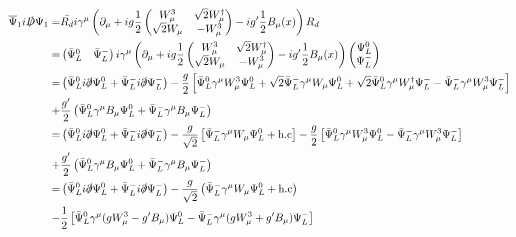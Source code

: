 \begin{align}
\label{eq:kin1}
\overline{\Psi}_1 i\slashed{D}\Psi_1 
=&\bar{R_d}i\gamma^{\mu}\left(\partial_{\mu}
+ig\dfrac{1}{2}\begin{pmatrix}
W_{\mu}^3 & \sqrt{2}W_{\mu}^{\dagger} \\
\sqrt{2}W_{\mu} & -W_{\mu}^3
\end{pmatrix}
-ig'\dfrac{1}{2} B_{\mu}(x)\right)R_d\nonumber\\
=&\begin{pmatrix}
\bar{\Psi}_L^0 & \bar{\Psi}_L^-
\end{pmatrix} i\gamma^{\mu}\left(\partial_{\mu}
+ig\dfrac{1}{2}\begin{pmatrix}
W_{\mu}^3 & \sqrt{2}W_{\mu}^{\dagger} \\
\sqrt{2}W_{\mu} & -W_{\mu}^3
\end{pmatrix}
-ig'\dfrac{1}{2} B_{\mu}(x)\right)\begin{pmatrix}
\Psi_L^0 \\ \Psi_L^-
\end{pmatrix}\nonumber\\
=&\left(\bar{\Psi}_L^0i\slashed{\partial}\Psi_L^0+\bar{\Psi}_L^-i\slashed{\partial}\Psi_L^-\right)
-\dfrac{g}{2}\left[\bar{\Psi}_L^0\gamma^{\mu}W_{\mu}^3\Psi_L^0+\sqrt{2}\bar{\Psi}_L^-\gamma^{\mu}W_{\mu}\Psi_L^0
+\sqrt{2}\bar{\Psi}_L^0\gamma^{\mu}W_{\mu}^{\dagger}\Psi_L^--\bar{\Psi}_L^-\gamma^{\mu}W_{\mu}^3\Psi_L^-\right]
\nonumber\\
+&\dfrac{g'}{2}\left(\bar{\Psi}_L^0\gamma^{\mu}B_{\mu}\Psi_L^0+\bar{\Psi}_L^-\gamma^{\mu}B_{\mu}\Psi_L^-\right)
\nonumber\\
=&\left(\bar{\Psi}_L^0i\slashed{\partial}\Psi_L^0+\bar{\Psi}_L^-i\slashed{\partial}\Psi_L^-\right)
-\dfrac{g}{\sqrt{2}}\left[\bar{\Psi}_L^-\gamma^{\mu}W_{\mu}\Psi_L^0
+\text{h.c}\right] - \dfrac{g}{2}\left[\bar{\Psi}_L^0\gamma^{\mu}W_{\mu}^3\Psi_L^0-\bar{\Psi}_L^-\gamma^{\mu}W_{\mu}^3\Psi_L^-\right]
\nonumber\\
+&\dfrac{g'}{2}\left(\bar{\Psi}_L^0\gamma^{\mu}B_{\mu}\Psi_L^0+\bar{\Psi}_L^-\gamma^{\mu}B_{\mu}\Psi_L^-\right)\nonumber\\
=&\left(\bar{\Psi}_L^0i\slashed{\partial}\Psi_L^0+\bar{\Psi}_L^-i\slashed{\partial}\Psi_L^-\right)
-\dfrac{g}{\sqrt{2}}\left(\bar{\Psi}_L^-\gamma^{\mu}W_{\mu}\Psi_L^0
+\text{h.c}\right)\nonumber\\
-& \dfrac{1}{2}\left[\bar{\Psi}_L^0\gamma^{\mu}(gW_{\mu}^3-g'B_{\mu})\Psi_L^0-\bar{\Psi}_L^-\gamma^{\mu}(gW_{\mu}^3+g'B_{\mu})\Psi_L^-\right]
\nonumber\\

\end{align}
